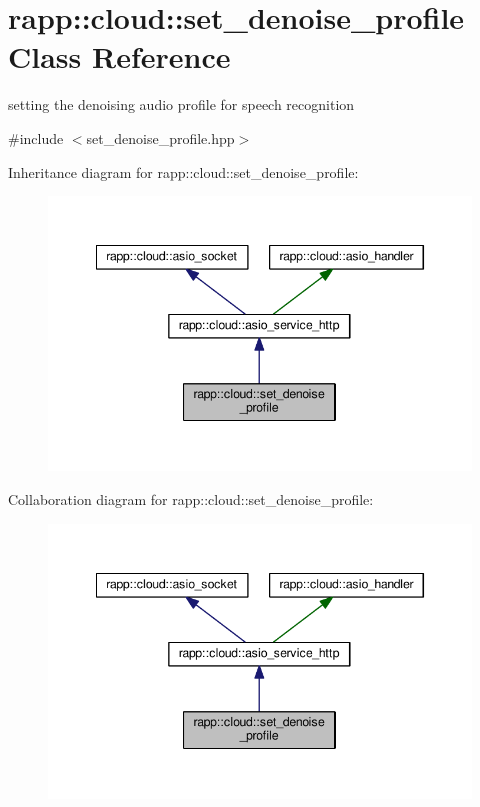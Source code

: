 \hypertarget{classrapp_1_1cloud_1_1set__denoise__profile}{\section{rapp\-:\-:cloud\-:\-:set\-\_\-denoise\-\_\-profile Class Reference}
\label{classrapp_1_1cloud_1_1set__denoise__profile}
}


setting the denoising audio profile for speech recognition  




{\ttfamily \#include $<$set\-\_\-denoise\-\_\-profile.\-hpp$>$}



Inheritance diagram for rapp\-:\-:cloud\-:\-:set\-\_\-denoise\-\_\-profile\-:
\nopagebreak
\begin{figure}[H]
\begin{center}
\leavevmode
\includegraphics[width=345pt]{classrapp_1_1cloud_1_1set__denoise__profile__inherit__graph}
\end{center}
\end{figure}


Collaboration diagram for rapp\-:\-:cloud\-:\-:set\-\_\-denoise\-\_\-profile\-:
\nopagebreak
\begin{figure}[H]
\begin{center}
\leavevmode
\includegraphics[width=345pt]{classrapp_1_1cloud_1_1set__denoise__profile__coll__graph}
\end{center}
\end{figure}
